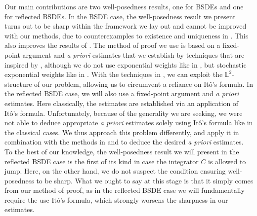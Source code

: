 \documentclass[10pt]{article} %
\def \L{\mathbb{L}}
\begin{document}
\medskip
Our main contributions are two well-posedness results, one for BSDEs and one for reflected BSDEs. In the BSDE case, the well-posedness result we present turns out to be sharp within the framework we lay out and cannot be improved with our methods, due to counterexamples to existence and uniqueness in \citeauthor*{confortola2014backward} \cite{confortola2014backward}. This also improves the results of \cite{papapantoleon2018existence}. The method of proof we use is based on a fixed-point argument and \emph{a priori} estimates that we establish by techniques that are inspired by \cite{elkaroui1997general}, although we do not use exponential weights like in \cite{elkaroui1997general,papapantoleon2018existence}, but stochastic exponential weights like in \cite{bandini2015existence,cohen2012existence}. With the techniques in \cite{elkaroui1997general}, we can exploit the $\L^2$-structure of our problem, allowing us to circumvent a reliance on It\^o's formula. In the reflected BSDE case, we will also use a fixed-point argument and \emph{a priori} estimates. Here classically, the estimates are established via an application of It\^o's formula. Unfortunately, because of the generality we are seeking, we were not able to deduce appropriate \emph{a priori} estimates solely using It\^o's formula like in the classical cases. We thus approach this problem differently, and apply it in combination with the methods in \cite{elkaroui1997general} and \cite{grigorova2020optimal} to deduce the desired \emph{a priori} estimates. To the best of our knowledge, the well-posedness result we will present in the reflected BSDE case is the first of its kind in case the integrator $C$ is allowed to jump. Here, on the other hand, we do not suspect the condition ensuring well-posedness to be sharp. What we ought to say at this stage is that it simply comes from our method of proof, as in the reflected BSDE case we will fundamentally require the use It\^o's formula, which strongly worsens the sharpness in our estimates.
\end{document}
